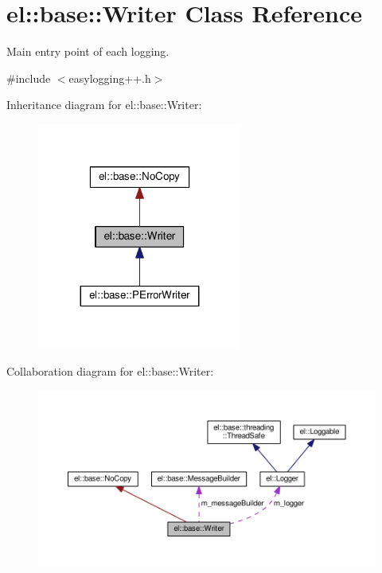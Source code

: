 \hypertarget{classel_1_1base_1_1_writer}{}\section{el\+:\+:base\+:\+:Writer Class Reference}
\label{classel_1_1base_1_1_writer}


Main entry point of each logging.  




{\ttfamily \#include $<$easylogging++.\+h$>$}



Inheritance diagram for el\+:\+:base\+:\+:Writer\+:
\nopagebreak
\begin{figure}[H]
\begin{center}
\leavevmode
\includegraphics[width=191pt]{classel_1_1base_1_1_writer__inherit__graph}
\end{center}
\end{figure}


Collaboration diagram for el\+:\+:base\+:\+:Writer\+:
\nopagebreak
\begin{figure}[H]
\begin{center}
\leavevmode
\includegraphics[width=350pt]{classel_1_1base_1_1_writer__coll__graph}
\end{center}
\end{figure}
